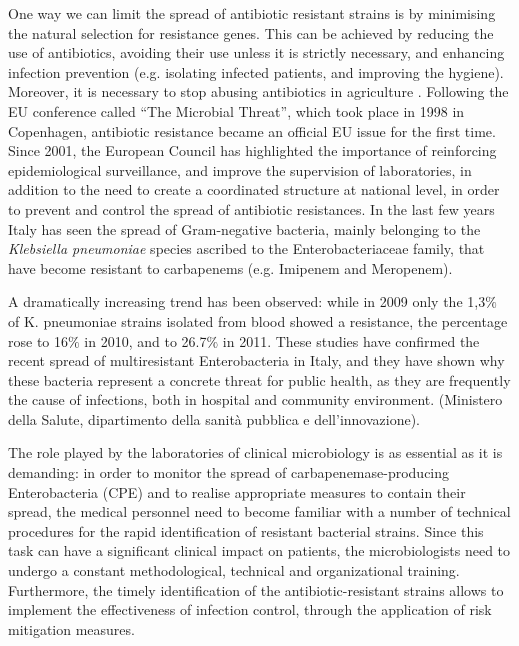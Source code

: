 \documentclass[11pt]{report}
\begin{document}
One way we can limit the spread of antibiotic resistant strains is by minimising the natural selection for resistance genes.
This can be achieved by reducing the use of antibiotics, avoiding their use unless it is strictly necessary, and enhancing infection prevention (e.g. isolating infected patients, and improving the hygiene).
Moreover, it is necessary to stop abusing antibiotics in agriculture \cite{Spellberg2014} \cite{doi:10.1093/emph/eou024}.
Following the EU conference called “The Microbial Threat”, which took place in 1998 in Copenhagen, antibiotic resistance became an official EU issue for the first time.
Since 2001, the European Council has highlighted the importance of reinforcing epidemiological surveillance, and improve the supervision of laboratories, in addition to the need to create a coordinated structure at national level, in order to prevent and control the spread of antibiotic resistances.
In the last few years Italy has seen the spread of Gram-negative bacteria, mainly belonging to the \emph{Klebsiella pneumoniae} species ascribed to the Enterobacteriaceae family, that have become resistant to carbapenems (e.g. Imipenem and Meropenem).

A dramatically increasing trend has been observed: while in 2009 only the 1,3$\%$ of K. pneumoniae strains isolated from blood showed a resistance, the percentage rose to 16$\%$ in 2010, and to 26.7$\%$ in 2011.
These studies have confirmed the recent spread of multiresistant Enterobacteria in Italy, and they have shown why these bacteria represent a concrete threat for public health, as they are frequently the cause of infections, both in hospital and community environment.
(Ministero della Salute, dipartimento della sanità pubblica e dell’innovazione).

The role played by the laboratories of clinical microbiology is as essential as it is demanding: in order to monitor the spread of carbapenemase-producing Enterobacteria (CPE) and to realise appropriate measures to contain their spread, the medical personnel need to become familiar with a number of technical procedures for the rapid identification of resistant bacterial strains.
Since this task can have a significant clinical impact on patients, the microbiologists need to undergo a constant methodological, technical and organizational training.
Furthermore, the timely identification of the antibiotic-resistant strains allows to implement the effectiveness of infection control, through the application of risk mitigation measures.
\end{document}
